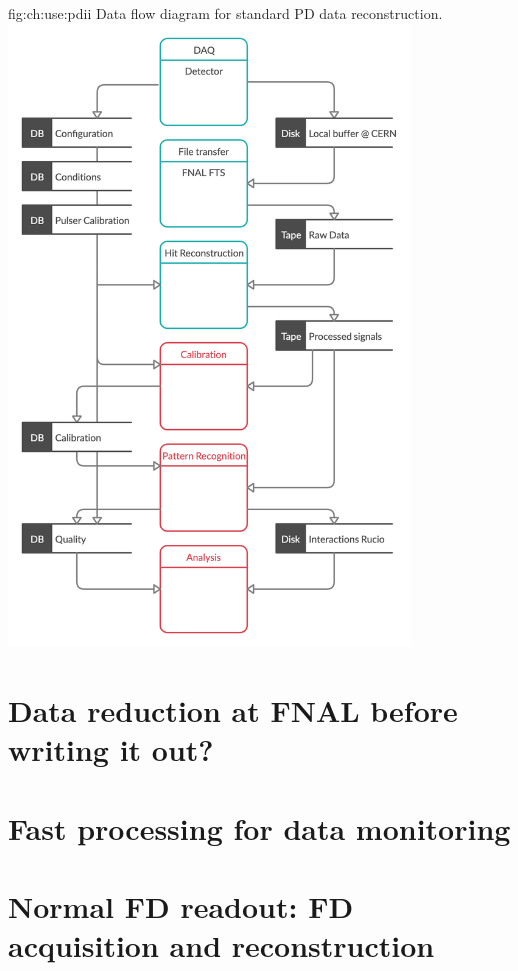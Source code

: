 \begin{dunefigure}
{fig:ch:use:pdii}
{Data flow diagram for standard PD data reconstruction.}
\includegraphics[width=0.8\textwidth]{graphics/IntroFigures/Data processing - PD - v1.png}
\end{dunefigure}
\pagebreak


\section{Data reduction at FNAL before writing it out?}

\section{Fast processing for data monitoring} 

\section{Normal FD readout: FD acquisition and reconstruction}
\label{sec:use:fdbeam}  %

